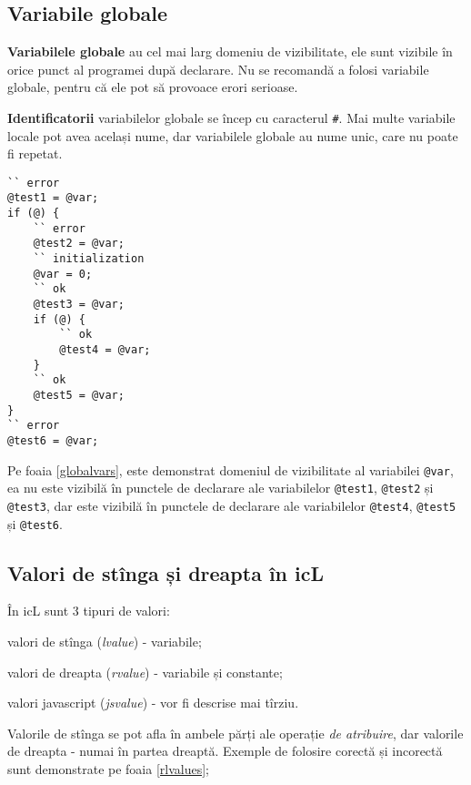 \subsection{Variabile globale}

\textbf{Variabilele globale} au cel mai larg domeniu de vizibilitate, ele sunt vizibile în orice punct al programei după declarare. Nu se recomandă a folosi variabile globale, pentru că ele pot să provoace erori serioase.

{\bf Identificatorii} variabilelor globale se încep cu caracterul {\color{blue2}\texttt{#}}. Mai multe variabile locale pot avea același nume, dar variabilele globale au nume unic, care nu poate fi repetat.

\begin{sourcecode}
\label{localvars}
\begin{verbatim}
`` error
@test1 = @var;
if (@) {
	`` error
	@test2 = @var;
	`` initialization
	@var = 0;
	`` ok
	@test3 = @var;
	if (@) {
		`` ok
		@test4 = @var;
	}
	`` ok
	@test5 = @var;
}
`` error
@test6 = @var;
\end{verbatim}
\end{sourcecode}

Pe foaia \ref{globalvars}, este demonstrat domeniul de vizibilitate al variabilei \texttt{@var}, ea nu este vizibilă în punctele de declarare ale variabilelor \texttt{@test1}, \texttt{@test2} și \texttt{@test3}, dar este vizibilă în punctele de declarare ale variabilelor \texttt{@test4}, \texttt{@test5} și \texttt{@test6}.

\subsection{Valori de stînga și dreapta în icL}

În icL sunt 3 tipuri de valori:

\begin{icEnum}
\item
	valori de stînga ({\it lvalue}) - variabile;
\item
	valori de dreapta ({\it rvalue}) - variabile și constante;
\item
	valori javascript ({\it jsvalue}) - vor fi descrise mai tîrziu.
\end{icEnum}

Valorile de stînga se pot afla în ambele părți ale operație {\it de atribuire}, dar valorile de dreapta - numai în partea dreaptă. Exemple de folosire corectă și incorectă sunt demonstrate pe foaia \ref{rlvalues};

